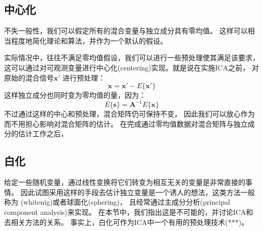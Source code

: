 \subsection{中心化}
不失一般性，我们可以假定所有的混合变量与独立成分具有零均值。
这样可以相当程度地简化理论和算法，并作为一个默认的假设。

实际情况中，往往不满足零均值假设，我们可以进行一些预处理使其满足该要求，
这可以通过对可观测变量进行中心化(centering)实现。就是说在实施ICA之前，
对原始的混合信号$\bm{x'}$
进行预处理：
\begin{equation} 
\bm{x=x'}-E\{\bm{x'}\}
\end{equation}
这样独立成分也同时变为零均值的量，因为：
\begin{equation}
E\{\bm{s}\}=\bm{A}^{-1}E\{\bm{x}\}
\end{equation}
不过通过这样的中心和预处理，混合矩阵仍可保持不变，
因此我们可以放心作为而不用担心影响对混合矩阵的估计。
在完成通过零均值数据对混合矩阵与独立成分的估计工作之后，
    
\subsection{白化}
给定一些随机变量，通过线性变换将它们转变为相互无关的变量是非常直接的事情。
因此试图采用这样的手段去估计独立变量是一个诱人的想法，这类方法一般称为
(whitenig)或者球面化(sphering)，
且经常通过主成分分析(principal component analysis)来实现。
在本节中，我们指出这是不可能的，并讨论ICA和去相关方法的关系。
事实上，白化可作为ICA中一个有用的预处理技术(***)。

